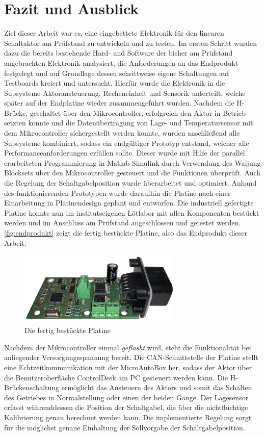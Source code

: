 \chapter{Fazit und Ausblick}\label{kap8}
Ziel dieser Arbeit war es, eine eingebettete Elektronik für den linearen Schaltaktor am Prüfstand zu entwickeln und zu testen. Im ersten Schritt wurden dazu die bereits bestehende Hard- und Software der bisher am Prüfstand angebrachten Elektronik analysiert, die Anforderungen an das Endprodukt festgelegt und auf Grundlage dessen schrittweise eigene Schaltungen auf Testboards kreiert und untersucht. Hierfür wurde die Elektronik in die Subsysteme Aktoransteuerung, Recheneinheit und Sensorik unterteilt, welche später auf der Endplatine wieder zusammengeführt wurden. Nachdem die H-Brücke, geschaltet über den Mikrocontroller, erfolgreich den Aktor in Betrieb setzten konnte und die Datenübertragung von Lage- und Temperatursensor mit dem Mikrocontroller sichergestellt werden konnte, wurden anschließend alle Subsysteme kombiniert, sodass ein endgültiger Prototyp entstand, welcher alle Performanceanforderungen erfüllen sollte. Dieser wurde mit Hilfe der parallel erarbeiteten Programmierung in Matlab Simulink durch Verwendung des Waijung Blocksets über den Mikrocontroller gesteuert und die Funktionen überprüft. Auch die Regelung der Schaltgabelposition wurde überarbeitet und optimiert.
Anhand des funktionierenden Prototypen wurde daraufhin die Platine nach einer Einarbeitung in Platinendesign geplant und entworfen. Die industriell gefertigte Platine konnte nun im institutseigenen Lötlabor mit allen Komponenten bestückt werden und im Anschluss am Prüfstand angeschlossen und getestet werden. \autoref{fig:endprodukt} zeigt die fertig bestückte Platine, also das Endprodukt dieser Arbeit.
\begin{figure}[H]
\centering
\includegraphics[width=220pt]{./Bilder/Endprodukt}
\caption{Die fertig bestückte Platine}
\label{fig:endprodukt}
\end{figure} \noindent
Nachdem der Mikrocontroller einmal \textit{geflasht} wird, steht die Funktionalität bei anliegender Versorgungsspannung bereit. Die CAN-Schnittstelle der Platine stellt eine Echtzeitkommunikation mit der MicroAutoBox her, sodass der Aktor über die Benutzeroberfläche ControlDesk am PC gesteuert werden kann. Die H-Brückenschaltung ermöglicht das Ansteuern des Aktors und somit das Schalten des Getriebes in Normalstellung oder einen der beiden Gänge. Der Lagesensor erfasst währenddessen die Position der Schaltgabel, die über die nichtflüchtige Kalibrierung genau berechnet werden kann. Die implementierte Regelung sorgt für die möglichst genaue Einhaltung der Sollvorgabe der Schaltgabelposition.
